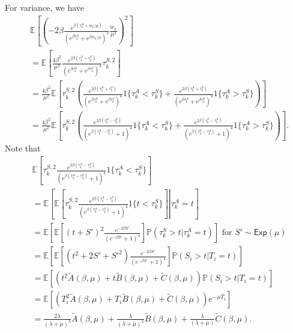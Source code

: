 For variance, we have
\begin{align*}
 & \mathbb{E}\left[\left(-2\beta\frac{e^{\beta(\tau_k^A+w_k/\mu)}}{(e^{\beta \tau_k^A}+e^{\beta w_k/\mu})^{2}}\frac{w_k}{\mu^{2}}\right)^{2}\right]\\
 & =\mathbb{E}\left[\frac{4\beta^{2}}{\mu^{2}}\frac{e^{2\beta(\tau_k^A+\tau_k^S)}}{\left(e^{\beta \tau_k^A}+e^{\beta \tau_k^S}\right)^{4}}\tau_k^{S,2}\right]\\
 & =\frac{4\beta^{2}}{\mu^{2}}\mathbb{E}\left[\tau_k^{S,2}\left(\frac{e^{2\beta(\tau_k^A+\tau_k^S)}}{\left(e^{\beta \tau_k^A}+e^{\beta \tau_k^S}\right)^{4}}1\{\tau_k^A<\tau_k^S\}+\frac{e^{2\beta(\tau_k^A+\tau_k^S)}}{\left(e^{\beta \tau_k^A}+e^{\beta \tau_k^S}\right)^{4}}1\{\tau_k^A>\tau_k^S\}\right)\right]\\
 & =\frac{4\beta^{2}}{\mu^{2}}\mathbb{E}\left[\tau_k^{S,2}\left(\frac{e^{2\beta(\tau_k^A-\tau_k^S)}}{\left(e^{\beta(\tau_k^A-\tau_k^S)}+1\right)^{4}}1\{\tau_k^A<\tau_k^S\}+\frac{e^{2\beta(\tau_k^S-\tau_k^A)}}{\left(e^{\beta(\tau_k^S-\tau_k^A)}+1\right)^{4}}1\{\tau_k^A>\tau_k^S\}\right)\right].
\end{align*}
Note that
\begin{align*}
 & \mathbb{E}\left[\tau_k^{S,2}\frac{e^{2\beta(\tau_k^A-\tau_k^S)}}{\left(e^{\beta(\tau_k^A-\tau_k^S)}+1\right)^{4}}1\{\tau_k^A<\tau_k^S\}\right]\\
 & =\mathbb{E}\left[\mathbb{E}\left[\left.\tau_k^{S,2}\frac{e^{2\beta(\tau_k^A-\tau_k^S)}}{\left(e^{\beta(\tau_k^A-\tau_k^S)}+1\right)^{4}}1\{t<\tau_k^S\}\right]\right|\tau_k^A=t\right]\\
 & =\mathbb{E}\left[\mathbb{E}\left[(t+S')^{2}\frac{e^{-2\beta S'}}{(e^{-\beta S'}+1)^{4}}\right]\mathbb{P}(\tau_k^S>t|\tau_k^A=t)\right] \mbox{ for $S'\sim \mathsf{Exp}(\mu)$}\\
 & =\mathbb{E}\left[\mathbb{E}\left[(t^{2}+2S'+S'^{2})\frac{e^{-2\beta S'}}{(e^{-\beta S'}+1)^{4}}\right]\mathbb{P}(S_{i}>t|T_{i}=t)\right]\\
 & =\mathbb{E}\left[\left(t^{2}\tilde{A}(\beta,\mu)+t\tilde{B}(\beta,\mu)+\tilde{C}(\beta,\mu)\right)\mathbb{P}(S_{i}>t|T_{i}=t)\right]\\
 & =\mathbb{E}\left[\left(T_{i}^{2}\tilde{A}(\beta,\mu)+T_{i}\tilde{B}(\beta,\mu)+\tilde{C}(\beta,\mu)\right)e^{-\mu T_{i}}\right]\\
 & =\frac{2\lambda}{(\lambda+\mu)^{3}}\tilde{A}(\beta,\mu)+\frac{\lambda}{(\lambda+\mu)^{2}}\tilde{B}(\beta,\mu)+\frac{\lambda}{(\lambda+\mu)}\tilde{C}(\beta,\mu).
\end{align*}
